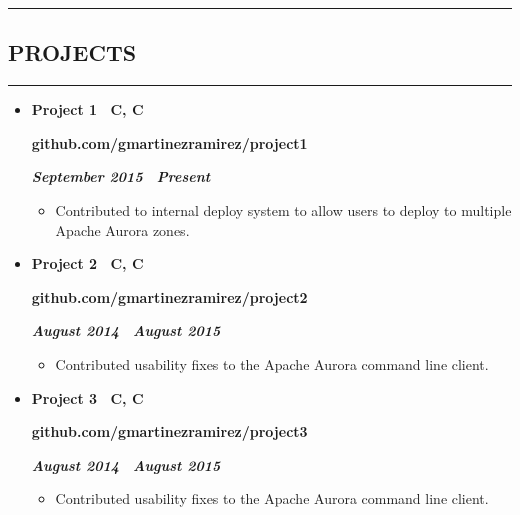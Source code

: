 \documentclass[10pt,letterpaper]{article}
\newcommand{\textbox}[1]{
  \parbox{.333\textwidth}{#1}
}
\newcommand{\CPP}
{C\nolinebreak[4]\hspace{-.05em}\raisebox{.22ex}{\footnotesize\bf ++}}
\newcommand{\sectionTitle}[1]{
  \hrule
  \vspace{-1.0em} 
  \subsection*{\uppercase{\textbf{#1}}}
  \vspace{-0.3em}
    \hrule
}
\newcommand{\titleExperienceWithoutLocation}[4]{
  \vspace{1.0em}
  
  \item[]
  {
    \textbox{\textbf{#1}\hfill}\textbox{\hfil \textbf{#2}\hfil}\hfill \textbf{\emph{#3 \textendash \ #4}}
  }
}
\begin{document}
  \sectionTitle{Projects}
  \begin{itemize}[leftmargin=*]
    \parskip=-0.6em 
    \titleExperienceWithoutLocation{Project 1 \ C, \CPP}{github.com/gmartinezramirez/project1}{September 2015}{Present}
      \begin{itemize}[label=\textbullet]
        \itemsep0em
        \item Contributed to internal deploy system to allow users to deploy to multiple Apache Aurora zones.
      \end{itemize}
  
    \titleExperienceWithoutLocation{Project 2 \ C, \CPP}{github.com/gmartinezramirez/project2}{August 2014}{August 2015}
      \begin{itemize}[label=\textbullet]
        \itemsep0em
        \item Contributed usability fixes to the Apache Aurora command line client.
      \end{itemize}

    \titleExperienceWithoutLocation{Project 3 \ C, \CPP}{github.com/gmartinezramirez/project3}{August 2014}{August 2015}
      \begin{itemize}[label=\textbullet]
        \itemsep0em
        \item Contributed usability fixes to the Apache Aurora command line client.
      \end{itemize}
  \end{itemize}
\end{document}
